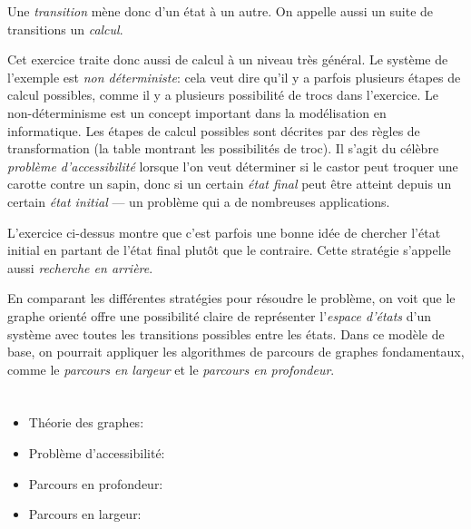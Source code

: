 {{Une \emph{transition} mène donc d’un état à un autre. On appelle aussi un suite de transitions un \emph{calcul}.

Cet exercice traite donc aussi de calcul à un niveau très général. Le système de l’exemple est \emph{non déterministe}: cela veut dire qu’il y a parfois plusieurs étapes de calcul possibles, comme il y a plusieurs possibilité de trocs dans l’exercice. Le non-déterminisme est un concept important dans la modélisation en informatique. Les étapes de calcul possibles sont décrites par des règles de transformation (la table montrant les possibilités de troc). Il s’agit du célèbre \emph{problème d’accessibilité} lorsque l’on veut déterminer si le castor peut troquer une carotte contre un sapin, donc si un certain \emph{état final} peut être atteint depuis un certain \emph{état initial} — un problème qui a de nombreuses applications.

L’exercice ci-dessus montre que c’est parfois une bonne idée de chercher l’état initial en partant de l’état final plutôt que le contraire. Cette stratégie s’appelle aussi \emph{recherche en arrière}.

En comparant les différentes stratégies pour résoudre le problème, on voit que le graphe orienté offre une possibilité claire de représenter l’\emph{espace d’états} d’un système avec toutes les transitions possibles entre les états. Dans ce modèle de base, on pourrait appliquer les algorithmes de parcours de graphes fondamentaux, comme le \emph{parcours en largeur} et le \emph{parcours en profondeur}.



\section*{\BrochureWebsitesAndKeywords}
{\raggedright
\begin{itemize}
  \item Théorie des graphes: \href{https://fr.wikipedia.org/wiki/Th\%C3\%A9orie_des_graphes}{}
  \item Problème d’accessibilité: \href{https://fr.wikipedia.org/wiki/Probl\%C3\%A8me_d\%27accessibilit\%C3\%A9}{}
  \item Parcours en profondeur: \href{https://fr.wikipedia.org/wiki/Algorithme_de_parcours_en_profondeur}{}
  \item Parcours en largeur: \href{https://fr.wikipedia.org/wiki/Algorithme_de_parcours_en_largeur}{}
\end{itemize}


}}}
